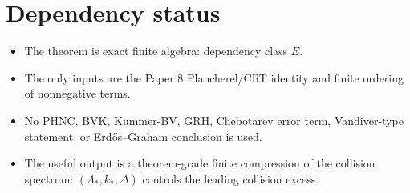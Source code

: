 \documentclass[11pt]{article}
\begin{document}
\section{Dependency status}

\begin{itemize}[leftmargin=2em]
\item The theorem is exact finite algebra: dependency class \(E\).
\item The only inputs are the Paper 8 Plancherel/CRT identity and finite ordering of nonnegative terms.
\item No PHNC, BVK, Kummer-BV, GRH, Chebotarev error term, Vandiver-type statement, or Erd\H{o}s--Graham conclusion is used.
\item The useful output is a theorem-grade finite compression of the collision spectrum: \((\Lambda_*,k_*,\Delta)\) controls the leading collision excess.
\end{itemize}
\end{document}
